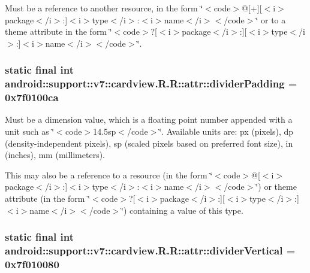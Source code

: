 Must be a reference to another resource, in the form \char`\"{}$<$code$>$@\mbox{[}+\mbox{]}\mbox{[}$<$i$>$package$<$/i$>$:\mbox{]}$<$i$>$type$<$/i$>$:$<$i$>$name$<$/i$>$$<$/code$>$\char`\"{} or to a theme attribute in the form \char`\"{}$<$code$>$?\mbox{[}$<$i$>$package$<$/i$>$:\mbox{]}\mbox{[}$<$i$>$type$<$/i$>$:\mbox{]}$<$i$>$name$<$/i$>$$<$/code$>$\char`\"{}. \hypertarget{classandroid_1_1support_1_1v7_1_1cardview_1_1_r_1_1attr_40cbb419dd17896194e1d6fb4305cc28}{
\subsubsection[{dividerPadding}]{\setlength{\rightskip}{0pt plus 5cm}static final int android::support::v7::cardview.R.R::attr::dividerPadding = 0x7f0100ca}}
\label{classandroid_1_1support_1_1v7_1_1cardview_1_1_r_1_1attr_40cbb419dd17896194e1d6fb4305cc28}


Must be a dimension value, which is a floating point number appended with a unit such as \char`\"{}$<$code$>$14.5sp$<$/code$>$\char`\"{}. Available units are: px (pixels), dp (density-independent pixels), sp (scaled pixels based on preferred font size), in (inches), mm (millimeters). 

This may also be a reference to a resource (in the form \char`\"{}$<$code$>$@\mbox{[}$<$i$>$package$<$/i$>$:\mbox{]}$<$i$>$type$<$/i$>$:$<$i$>$name$<$/i$>$$<$/code$>$\char`\"{}) or theme attribute (in the form \char`\"{}$<$code$>$?\mbox{[}$<$i$>$package$<$/i$>$:\mbox{]}\mbox{[}$<$i$>$type$<$/i$>$:\mbox{]}$<$i$>$name$<$/i$>$$<$/code$>$\char`\"{}) containing a value of this type. \hypertarget{classandroid_1_1support_1_1v7_1_1cardview_1_1_r_1_1attr_1de7dd5348d19143c8e5eea726301bb7}{
\subsubsection[{dividerVertical}]{\setlength{\rightskip}{0pt plus 5cm}static final int android::support::v7::cardview.R.R::attr::dividerVertical = 0x7f010080}}
\label{classandroid_1_1support_1_1v7_1_1cardview_1_1_r_1_1attr_1de7dd5348d19143c8e5eea726301bb7}


